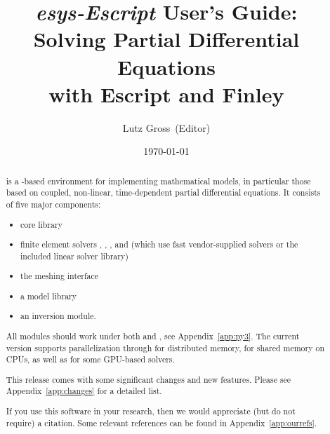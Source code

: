 \documentclass{esysdoc}
\title{\emph{esys-Escript} User's Guide:\\ Solving Partial Differential Equations\\ with Escript and Finley}
\author{Lutz Gross\etal~(Editor)}
\date{\today}
\begin{document}
\maketitle

\ifpdf
{}
\fi





\begin{abstract}%
\escript is a \PYTHON-based environment for implementing mathematical models, in particular those based on coupled, non-linear, time-dependent partial differential equations.
It consists of five major components:
\begin{itemize}
\item \escript core library
\item finite element solvers \finley, \dudley, \ripley, and \speckley (which
    use fast vendor-supplied solvers or the included \PASO linear solver library)
\item the meshing interface \pycad
\item a model library
\item an inversion module.
\end{itemize}

All \escript modules should work under both  and , see
Appendix~\ref{app:py3}.
The current version supports parallelization through \MPI for distributed
memory, \OPENMP for shared memory on CPUs, as well as \CUDA for some GPU-based
solvers.

This release comes with some significant changes and new features.
Please see Appendix~\ref{app:changes} for a detailed list.

If you use this software in your research, then we would appreciate (but do not
require) a citation.
Some relevant references can be found in Appendix~\ref{app:ourrefs}.
\end{abstract}


\cleardoublepage{}%
\tableofcontents













\esysappendix %

%


\cleardoublepage
{}
{}
\printindex

\cleardoublepage
{}
{}


\end{document}
